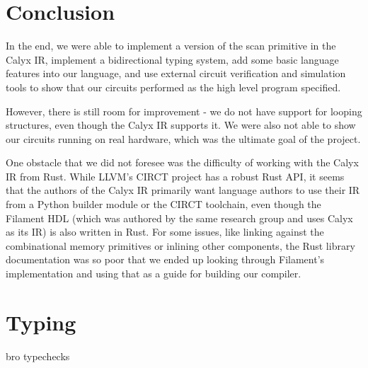 \documentclass[12pt]{article}
\begin{document}
\section{Conclusion}
In the end, we were able to implement a version of the scan primitive in the Calyx IR, implement a bidirectional
typing system, add some basic language features into our language, and use external circuit verification and simulation
tools to show that our circuits performed as the high level program specified.

However, there is still room for improvement - we do not have support for looping structures, even though the Calyx IR supports
it. We were also not able to show our circuits running on real hardware, which was the ultimate goal of the project.

One obstacle that we did not foresee was the difficulty of working with the Calyx IR from Rust. While LLVM's CIRCT project
has a robust Rust API, it seems that the authors of the Calyx IR primarily want language authors to use their IR from
a Python builder module or the CIRCT toolchain, even though the Filament HDL (which was authored by the same research
group and uses Calyx as its IR) is also written in Rust. For some issues, like linking against the combinational memory
primitives or inlining other components, the Rust library documentation was so poor that we ended up looking through
Filament's implementation and using that as a guide for building our compiler.

\section{Typing}
bro typechecks
\end{document}
